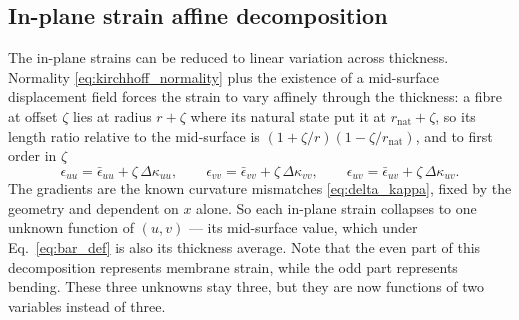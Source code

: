 \documentclass[11pt]{article}
\begin{document}
\subsection{In-plane strain affine decomposition}\label{sec:strain_affine}
The in-plane strains can be reduced to linear variation across thickness. Normality
\eqref{eq:kirchhoff_normality} plus the existence of a mid-surface displacement
field forces the strain to vary affinely through the thickness: a fibre at offset
$\zeta$ lies at radius $r+\zeta$ where its natural state put it at
$r_{\mathrm{nat}}+\zeta$, so its length ratio relative to the mid-surface is
$\left(1+\zeta/r\right)\left(1-\zeta/r_{\mathrm{nat}}\right)$, and to first order
in $\zeta$
\begin{equation}\label{eq:strain_thickness}
    \boxed{\;\epsilon_{uu} = \bar\epsilon_{uu} + \zeta\,\Delta\kappa_{uu},
    \qquad
    \epsilon_{vv} = \bar\epsilon_{vv} + \zeta\,\Delta\kappa_{vv},
    \qquad
    \epsilon_{uv} = \bar\epsilon_{uv} + \zeta\,\Delta\kappa_{uv}.\;}
\end{equation}
The gradients are the known curvature mismatches
\eqref{eq:delta_kappa}, fixed by the geometry and dependent on $x$ alone. So each
in-plane strain collapses to one unknown function of $(u,v)$ --- its mid-surface
value, which under Eq.~\eqref{eq:bar_def} is also its thickness average. Note that the even
part of this decomposition represents membrane strain, while the odd part represents bending.
These three unknowns stay three, but they are now functions of two variables instead of three.
\end{document}
